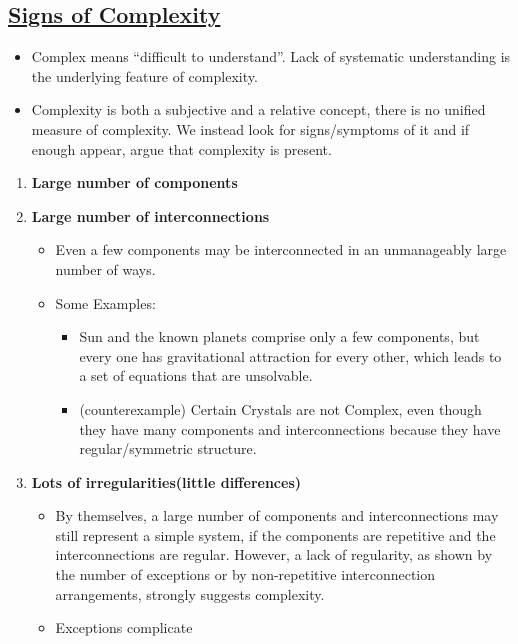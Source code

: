\documentclass{article}
\begin{document}
\subsection*{\underline{Signs of Complexity}}

\begin{itemize}
    \item Complex means “difficult to understand”. Lack of systematic understanding is the underlying feature of complexity. 
    \item Complexity is both a subjective and a relative concept, there is no unified measure of complexity. We instead look for signs/symptoms of it and if enough appear, argue that complexity is present.
\end{itemize}

\begin{enumerate}
    \item \textbf{Large number of components}
    \item \textbf{Large number of interconnections}
    \begin{itemize}
        \item Even a few components may be interconnected in an unmanageably large number of ways.
        \item[] Some Examples:
        \begin{itemize}
            \item Sun and the
            known planets comprise only a few components, but every one has gravitational attraction for every other, which leads to a set of equations that are unsolvable.
            \item (counterexample) Certain Crystals are not Complex, even though they have many components and interconnections because they have regular/symmetric structure.
        \end{itemize}
    \end{itemize}
    \item \textbf{Lots of irregularities(little differences)}
    \begin{itemize}
        \item By themselves, a large number of components and interconnections may still represent a simple system, if the components are repetitive and the interconnections are regular. However, a lack of regularity, as shown by the number of exceptions or by non-repetitive interconnection arrangements, strongly suggests complexity.
        \item Exceptions complicate

\end{itemize}
\end{enumerate}
\end{document}

